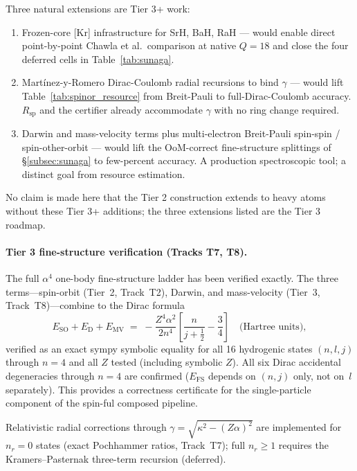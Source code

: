 \documentclass[aps,pra,twocolumn,superscriptaddress,longbibliography]{revtex4-2}
\begin{document}
Three natural extensions are Tier 3+ work:
\begin{enumerate}
  \item Frozen-core [Kr] infrastructure for SrH, BaH, RaH — would
    enable direct point-by-point Chawla et al.\ comparison at native $Q = 18$
    and close the four deferred cells in Table~\ref{tab:sunaga}.
  \item Martínez-y-Romero Dirac-Coulomb radial recursions to bind
    $\gamma$ — would lift Table~\ref{tab:spinor_resource} from
    Breit-Pauli to full-Dirac-Coulomb accuracy. $R_{\mathrm{sp}}$ and
    the certifier already accommodate $\gamma$ with no ring change
    required.
  \item Darwin and mass-velocity terms plus multi-electron
    Breit-Pauli spin-spin / spin-other-orbit — would lift the
    OoM-correct fine-structure splittings of \S\ref{subsec:sunaga} to
    few-percent accuracy. A production spectroscopic tool; a distinct
    goal from resource estimation.
\end{enumerate}

No claim is made here that the Tier 2 construction extends to heavy
atoms without these Tier 3+ additions; the three extensions listed
are the Tier 3 roadmap.

\paragraph{Tier 3 fine-structure verification (Tracks T7, T8).}
The full $\alpha^4$ one-body fine-structure ladder has been verified
exactly.  The three terms---spin-orbit (Tier~2, Track~T2), Darwin, and
mass-velocity (Tier~3, Track~T8)---combine to the Dirac formula
\begin{equation}\label{eq:dirac_fs}
  E_{\mathrm{SO}} + E_{\mathrm{D}} + E_{\mathrm{MV}}
  \;=\; -\frac{Z^4\alpha^2}{2n^4}\left[\frac{n}{j+\tfrac{1}{2}}
        - \frac{3}{4}\right] \quad \text{(Hartree units)},
\end{equation}
verified as an exact sympy symbolic equality for all 16 hydrogenic
states $(n,l,j)$ through $n = 4$ and all $Z$ tested (including symbolic
$Z$).  All six Dirac accidental degeneracies through $n = 4$ are
confirmed ($E_{\mathrm{FS}}$ depends on $(n,j)$ only, not on~$l$
separately).  This provides a correctness certificate for the
single-particle component of the spin-ful composed pipeline.

Relativistic radial corrections through $\gamma = \sqrt{\kappa^2 -
(Z\alpha)^2}$ are implemented for $n_r = 0$ states (exact Pochhammer
ratios, Track~T7); full $n_r \geq 1$ requires the Kramers--Pasternak
three-term recursion (deferred).
\end{document}
